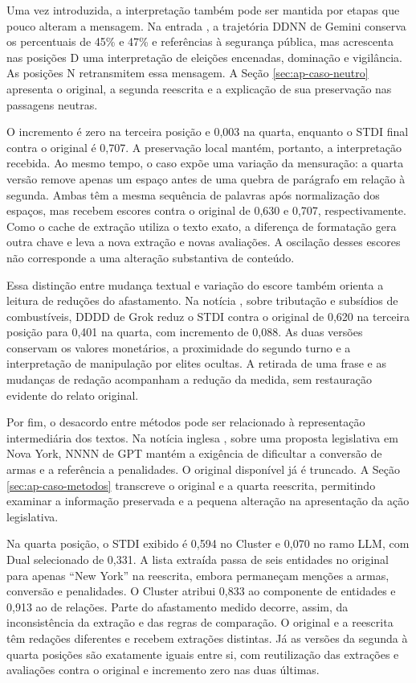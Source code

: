 Uma vez introduzida, a interpretação também pode ser mantida por etapas que pouco alteram a mensagem. Na entrada , a trajetória DDNN de Gemini conserva os percentuais de 45\% e 47\% e referências à segurança pública, mas acrescenta nas posições D uma interpretação de eleições encenadas, dominação e vigilância. As posições N retransmitem essa mensagem. A Seção \ref{sec:ap-caso-neutro} apresenta o original, a segunda reescrita e a explicação de sua preservação nas passagens neutras.

O incremento é zero na terceira posição e 0,003 na quarta, enquanto o STDI final contra o original é 0,707. A preservação local mantém, portanto, a interpretação recebida. Ao mesmo tempo, o caso expõe uma variação da mensuração: a quarta versão remove apenas um espaço antes de uma quebra de parágrafo em relação à segunda. Ambas têm a mesma sequência de palavras após normalização dos espaços, mas recebem escores contra o original de 0,630 e 0,707, respectivamente. Como o cache de extração utiliza o texto exato, a diferença de formatação gera outra chave e leva a nova extração e novas avaliações. A oscilação desses escores não corresponde a uma alteração substantiva de conteúdo.

Essa distinção entre mudança textual e variação do escore também orienta a leitura de reduções do afastamento. Na notícia , sobre tributação e subsídios de combustíveis, DDDD de Grok reduz o STDI contra o original de 0,620 na terceira posição para 0,401 na quarta, com incremento de 0,088. As duas versões conservam os valores monetários, a proximidade do segundo turno e a interpretação de manipulação por elites ocultas. A retirada de uma frase e as mudanças de redação acompanham a redução da medida, sem restauração evidente do relato original.

Por fim, o desacordo entre métodos pode ser relacionado à representação intermediária dos textos. Na notícia inglesa , sobre uma proposta legislativa em Nova York, NNNN de GPT mantém a exigência de dificultar a conversão de armas e a referência a penalidades. O original disponível já é truncado. A Seção \ref{sec:ap-caso-metodos} transcreve o original e a quarta reescrita, permitindo examinar a informação preservada e a pequena alteração na apresentação da ação legislativa.

Na quarta posição, o STDI exibido é 0,594 no Cluster e 0,070 no ramo LLM, com Dual selecionado de 0,331. A lista extraída passa de seis entidades no original para apenas ``New York'' na reescrita, embora permaneçam menções a armas, conversão e penalidades. O Cluster atribui 0,833 ao componente de entidades e 0,913 ao de relações. Parte do afastamento medido decorre, assim, da inconsistência da extração e das regras de comparação. O original e a reescrita têm redações diferentes e recebem extrações distintas. Já as versões da segunda à quarta posições são exatamente iguais entre si, com reutilização das extrações e avaliações contra o original e incremento zero nas duas últimas.

